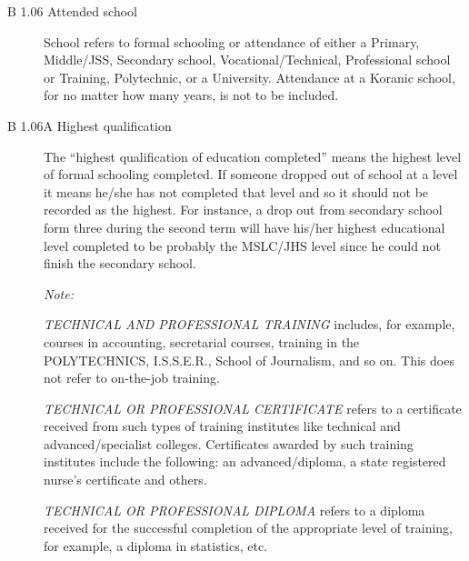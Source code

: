 \documentclass[a4paper]{refart}
\begin{document}
\begin{description}
\item[B 1.06 Attended school] School refers to formal schooling or attendance of either a Primary, Middle/JSS, Secondary school, Vocational/Technical, Professional school or Training, Polytechnic, or a University. Attendance at a Koranic school, for no matter how many years, is not to be included.

\item[B 1.06A Highest qualification] The ``highest qualification of education completed'' means the highest level of formal schooling completed. If someone dropped out of school at a level it means he/she has not completed that level and so it should not be recorded as the highest. For instance, a drop out from secondary school form three during the second term will have his/her highest educational level completed to be probably the MSLC/JHS level since he could not finish the secondary school.

\textit{Note:}

\textit{TECHNICAL AND PROFESSIONAL TRAINING} includes, for example, courses in accounting, secretarial courses, training in the POLYTECHNICS, I.S.S.E.R., School of Journalism, and so on. This does not refer to on-the-job training.

\textit{TECHNICAL OR PROFESSIONAL CERTIFICATE} refers to a certificate received from such types of training institutes like technical and advanced/specialist colleges. Certificates awarded by such training institutes include the following: an advanced/diploma, a state registered nurse's certificate and others.

\textit{TECHNICAL OR PROFESSIONAL DIPLOMA} refers to a diploma received for the successful completion of the appropriate level of training, for example, a diploma in statistics, etc.

\end{description}
\end{document}
